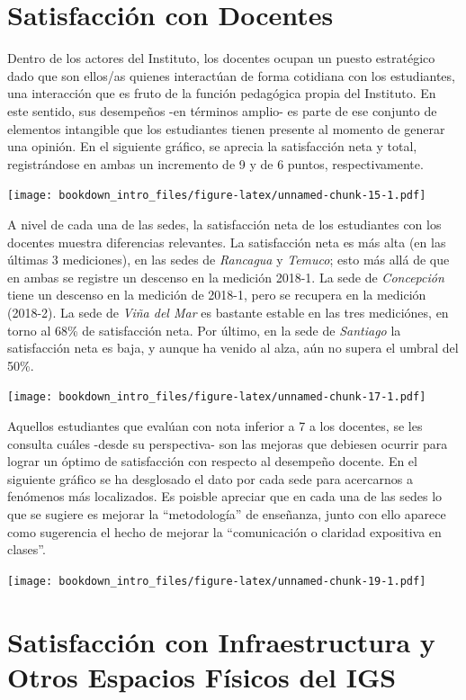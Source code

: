 \documentclass[]{book}
\begin{document}
\section{Satisfacción con Docentes}\label{satisfaccion-con-docentes}

Dentro de los actores del Instituto, los docentes ocupan un puesto
estratégico dado que son ellos/as quienes interactúan de forma cotidiana
con los estudiantes, una interacción que es fruto de la función
pedagógica propia del Instituto. En este sentido, sus desempeños -en
términos amplio- es parte de ese conjunto de elementos intangible que
los estudiantes tienen presente al momento de generar una opinión. En el
siguiente gráfico, se aprecia la satisfacción neta y total,
registrándose en ambas un incremento de 9 y de 6 puntos,
respectivamente.

\texttt{[image: bookdown\_intro\_files/figure-latex/unnamed-chunk-15-1.pdf]}

A nivel de cada una de las sedes, la satisfacción neta de los
estudiantes con los docentes muestra diferencias relevantes. La
satisfacción neta es más alta (en las últimas 3 mediciones), en las
sedes de \emph{Rancagua} y \emph{Temuco}; esto más allá de que en ambas
se registre un descenso en la medición 2018-1. La sede de
\emph{Concepción} tiene un descenso en la medición de 2018-1, pero se
recupera en la medición (2018-2). La sede de \emph{Viña del Mar} es
bastante estable en las tres mediciónes, en torno al 68\% de
satisfacción neta. Por último, en la sede de \emph{Santiago} la
satisfacción neta es baja, y aunque ha venido al alza, aún no supera el
umbral del 50\%.

\texttt{[image: bookdown\_intro\_files/figure-latex/unnamed-chunk-17-1.pdf]}

Aquellos estudiantes que evalúan con nota inferior a 7 a los docentes,
se les consulta cuáles -desde su perspectiva- son las mejoras que
debiesen ocurrir para lograr un óptimo de satisfacción con respecto al
desempeño docente. En el siguiente gráfico se ha desglosado el dato por
cada sede para acercarnos a fenómenos más localizados. Es poisble
apreciar que en cada una de las sedes lo que se sugiere es mejorar la
``metodología'' de enseñanza, junto con ello aparece como sugerencia el
hecho de mejorar la ``comunicación o claridad expositiva en clases''.

\texttt{[image: bookdown\_intro\_files/figure-latex/unnamed-chunk-19-1.pdf]}

\section{Satisfacción con Infraestructura y Otros Espacios Físicos del
IGS}\label{satisfaccion-con-infraestructura-y-otros-espacios-fisicos-del-igs}
\end{document}
